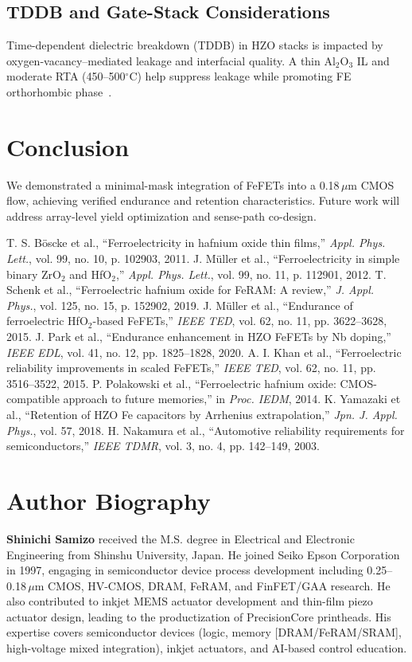 \documentclass[conference]{IEEEtran}
\begin{document}
\subsection{TDDB and Gate-Stack Considerations}
Time-dependent dielectric breakdown (TDDB) in HZO stacks is impacted by oxygen-vacancy–mediated leakage and interfacial quality. A thin Al$_2$O$_3$ IL and moderate RTA (450--500$^\circ$C) help suppress leakage while promoting FE orthorhombic phase~\cite{schenk2019}.

\section{Conclusion}
We demonstrated a minimal-mask integration of FeFETs into a 0.18\,$\mu$m CMOS flow, achieving verified endurance and retention characteristics. Future work will address array-level yield optimization and sense-path co-design.

\begin{thebibliography}{9}
 T. S. Böscke et al., ``Ferroelectricity in hafnium oxide thin films,'' \textit{Appl. Phys. Lett.}, vol. 99, no. 10, p. 102903, 2011.
 J. Müller et al., ``Ferroelectricity in simple binary ZrO$_2$ and HfO$_2$,'' \textit{Appl. Phys. Lett.}, vol. 99, no. 11, p. 112901, 2012.
 T. Schenk et al., ``Ferroelectric hafnium oxide for FeRAM: A review,'' \textit{J. Appl. Phys.}, vol. 125, no. 15, p. 152902, 2019.
 J. Müller et al., ``Endurance of ferroelectric HfO$_2$-based FeFETs,'' \textit{IEEE TED}, vol. 62, no. 11, pp. 3622--3628, 2015.
 J. Park et al., ``Endurance enhancement in HZO FeFETs by Nb doping,'' \textit{IEEE EDL}, vol. 41, no. 12, pp. 1825--1828, 2020.
 A. I. Khan et al., ``Ferroelectric reliability improvements in scaled FeFETs,'' \textit{IEEE TED}, vol. 62, no. 11, pp. 3516--3522, 2015.
 P. Polakowski et al., ``Ferroelectric hafnium oxide: CMOS-compatible approach to future memories,'' in \textit{Proc. IEDM}, 2014.
 K. Yamazaki et al., ``Retention of HZO Fe capacitors by Arrhenius extrapolation,'' \textit{Jpn. J. Appl. Phys.}, vol. 57, 2018.
 H. Nakamura et al., ``Automotive reliability requirements for semiconductors,'' \textit{IEEE TDMR}, vol. 3, no. 4, pp. 142--149, 2003.
\end{thebibliography}

\section*{Author Biography}
\textbf{Shinichi Samizo} received the M.S. degree in Electrical and Electronic Engineering from Shinshu University, Japan. He joined Seiko Epson Corporation in 1997, engaging in semiconductor device process development including 0.25--0.18\,$\mu$m CMOS, HV-CMOS, DRAM, FeRAM, and FinFET/GAA research. He also contributed to inkjet MEMS actuator development and thin-film piezo actuator design, leading to the productization of PrecisionCore printheads. His expertise covers semiconductor devices (logic, memory [DRAM/FeRAM/SRAM], high-voltage mixed integration), inkjet actuators, and AI-based control education.
\end{document}
